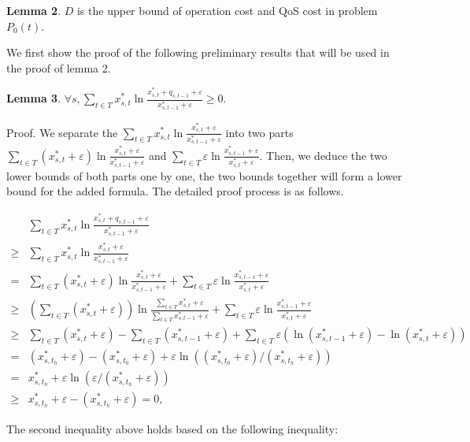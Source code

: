 \documentclass[journal,article,submit,pdftex,moreauthors]{Definitions/mdpi}
\begin{document}
\textbf{Lemma 2}. $D$ is the upper bound of operation cost and QoS cost in problem $P_0(t)$. 

 
We first show the proof of the following preliminary results that will be used in the proof of lemma 2.

\textbf{Lemma 3}. $\forall s, \sum_{t\in T}x_{s,t}^{*}\ln \frac{x_{s,t}^{*}+q_{s,t-1}+\varepsilon}{x_{s,t-1}^{*}+\varepsilon} \ge 0 $.


Proof. We separate the $\sum_{t\in T}x_{s,t}^{*}\ln \frac{x_{s,t}^{*}+\varepsilon}{x_{s,t-1}^{*}+\varepsilon}$ into two parts $\sum_{t\in T}(x_{s,t}^{*}+\varepsilon)\ln \frac{x_{s,t}^{*}+\varepsilon}{x_{s,t-1}^{*}+\varepsilon}$ and $\sum_{t\in T}\varepsilon\ln \frac{x_{s,t-1}^{*}+\varepsilon}{x_{s,t}^{*}+\varepsilon}$. Then, we deduce the two lower bounds of both parts one by one, the two bounds together will form a lower bound for the added formula. The detailed  proof process is as follows.

\begin{align*}
&\sum_{t\in T}x_{s,t}^{*}\ln\frac{x_{s,t}^{*}+q_{s,t-1}+\varepsilon}{x_{s,t-1}^{*}+\varepsilon} \\
\ge & \sum_{t\in T}x_{s,t}^{*}\ln \frac{x_{s,t}^{*}+\varepsilon}{x_{s,t-1}^{*}+\varepsilon}\\
=&\sum_{t\in T}(x_{s,t}^{*}+\varepsilon)\ln \frac{x_{s,t}^{*}+\varepsilon}{x_{s,t-1}^{*}+\varepsilon}+\sum_{t\in T}\varepsilon\ln \frac{x_{s,t-1}^{*}+\varepsilon}{x_{s,t}^{*}+\varepsilon}\\
\ge & ( \sum_{t\in T}(x_{s,t}^{*}+\varepsilon))\ln \frac{ \sum_{t\in T} x_{s,t}^{*}+\varepsilon }{ \sum_{t\in T} x_{s,t-1}^{*}+\varepsilon } +\sum_{t\in T}\varepsilon\ln \frac{x_{s,t-1}^{*}+\varepsilon}{x_{s,t}^{*}+\varepsilon}\\
\ge & \sum_{t\in T}(x_{s,t}^{*}+\varepsilon)- \sum_{t\in T}(x_{s,t-1}^{*}+\varepsilon)+ \sum_{t\in T}\varepsilon (\ln(x_{s,t-1}^{*}+\varepsilon)- \ln(x_{s,t}^{*}+\varepsilon)) \\
=&(x_{s,t_h}^{*}+\varepsilon)- (x_{s,t_0}^{*}+\varepsilon)+\varepsilon \ln((x_{s,t_0}^{*}+\varepsilon)/( x_{s,t_h}^{*}+\varepsilon))\\
=& x_{s,t_h}^{*}+\varepsilon \ln(\varepsilon/( x_{s,t_h}^{*}+\varepsilon))\\
\ge & x_{s,t_h}^{*}+\varepsilon-(x_{s,t_h}^{*}+\varepsilon)=0,
\end{align*}

The second inequality above holds based on the following inequality:
\end{document}
